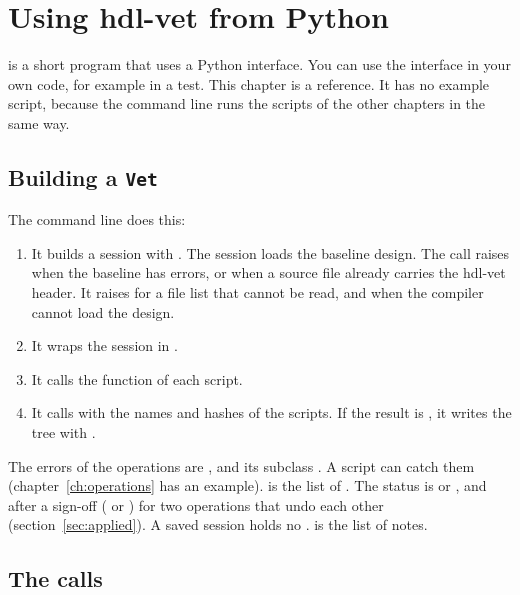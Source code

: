 \chapter{Using hdl-vet from Python}
\label{ch:python}

 is a short program that uses a Python interface. You can use the
interface in your own code, for example in a test. This chapter is a reference. It has
no example script, because the command line runs the scripts of the other chapters in
the same way.

\section{Building a \texttt{Vet}}

The command line does this:

\begin{enumerate}
\item It builds a session with . The session loads the baseline design. The call raises
   when the baseline has errors, or when a source file already
  carries the hdl-vet header. It raises  for a file list that cannot
  be read, and  when the compiler cannot load the design.
\item It wraps the session in .
\item It calls the function  of each script.
\item It calls  with the names and hashes of the scripts. If the
  result is , it writes the tree with .
\end{enumerate}

The errors of the operations are , and its subclass
. A script can catch them (chapter~\ref{ch:operations} has an
example).  is the list of . The status is
 or , and after a sign-off ( or )
 for two operations that undo each other (section~\ref{sec:applied}).
A saved session holds no .  is the list of notes.

\section{The calls}

